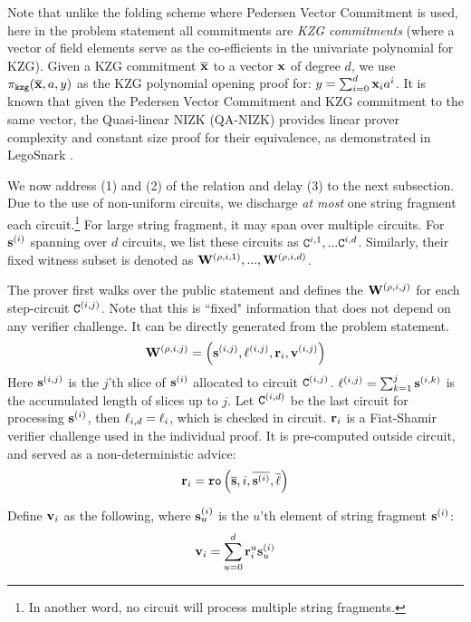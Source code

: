 Note that unlike the folding scheme where Pedersen Vector Commitment
is used, here in the problem statement
all commitments are {\em KZG commitments} 
(where a vector of field elements serve
as the co-efficients in the univariate polynomial for KZG).
Given a KZG commitment $\overline{{{\mathbf {x}}}}$ 
to a vector ${{\mathbf {x}}}$
of degree $d$, we 
use $\pi_{\texttt{kzg}}(\overline{{{\mathbf {x}}}}, a, y)$ 
as the KZG polynomial
opening proof for: $y = \sum_{i=0}^d {{\mathbf {x}}}_i a^i$.
It is known that given the Pedersen Vector Commitment and
KZG commitment to the same vector, the Quasi-linear NIZK (QA-NIZK)
\cite{Gonzalez15} provides linear prover complexity and constant
size proof for their equivalence, as demonstrated in LegoSnark \cite{LegoSnark}.

We now address (1) and (2) of the relation and delay (3) to the next
subsection.  Due to the
use of non-uniform circuits, we discharge {\em at most} one 
string fragment each circuit.\footnote{In another word,
no circuit will process multiple string fragments.}
For large string fragment, it may span over multiple circuits.
For ${{\mathbf {s}}}^{(i)}$ spanning over $d$ circuits, we list
these circuits as ${\texttt{C}}^{{i,1}}, ... {\texttt{C}}^{{i,d}}$.
Similarly, their fixed witness subset is denoted as
${{\mathbf {W}}}^{(\rho,i,1)}, ..., {{\mathbf {W}}}^{(\rho,i,d)}$.

The prover first walks over the public statement and defines
the ${{\mathbf {W}}}^{(\rho,i,j)}$ for each step-circuit ${\texttt{C}}^{(i,j)}$.
Note that this is ``fixed" information that does not depend
on any verifier challenge. It can be directly generated from
the problem statement.
\[
	{{\mathbf {W}}}^{(\rho,i,j)} = \left({{\mathbf {s}}}^{(i,j)}, {{\mathbf {\ell}}}^{(i,j)}, 
	{{\mathbf {r}}}_{i}, {{\mathbf {v}}}^{(i,j)}\right)
\]
Here ${{\mathbf {s}}}^{(i,j)}$ is the $j$'th slice of ${{\mathbf {s}}}^{(i)}$
allocated to circuit ${\texttt{C}}^{(i,j)}$.
$\ell^{(i,j)} = \sum_{k=1}^j {{\mathbf {s}}}^{(i,k)}$ is the accumulated
length of slices up to $j$. Let ${\texttt{C}}^{(i,d)}$ be the
last circuit for processing ${{\mathbf {s}}}^{(i)}$, then
${{\mathbf {\ell}}}_{i,d} = \ell_{i}$, which is checked in circuit.
${{\mathbf {r}}}_i$ is a Fiat-Shamir verifier challenge used in
the individual proof. It is pre-computed 
outside circuit, and served as a non-deterministic advice:
\begin{equation}
	{{\mathbf {r}}}_i = 
		\texttt{ro}\left(\overline{{{\mathbf {s}}}}, i,
			\overline{{{\mathbf {s}}}^{(i)}}, 
			\overline{{{\mathbf {\ell}}}}\right) 
\end{equation}

Define ${{\mathbf {v}}}_i$ as the following, where
${{\mathbf {s}}}^{(i)}_u$ is the $u$'th element of
string fragment ${{\mathbf {s}}}^{(i)}$:
\begin{equation}
	{{\mathbf {v}}}_i = \sum_{u=0}^{d} {{\mathbf {r}}}_i^u {{\mathbf {s}}}^{(i)}_u
\end{equation}


